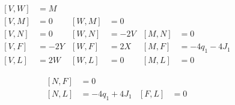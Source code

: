 \begin{subequations}
\begin{align}
[V,W]&=M\\
[V,M]&=0&[W,M]&=0\\
[V,N]&=0&[W,N]&=-2V&[M,N]&=0\\
[V,F]&=-2Y&[W,F]&=2X&[M,F]&=-4q_1-4J_1\\
[V,L]&=2W&[W,L]&=0&[M,L]&=0
\end{align}
\end{subequations}


\begin{subequations}
\begin{align}
[N,F]&=0\\
[N,L]&=-4q_1+4J_1&[F,L]&=0
\end{align}
\end{subequations}

